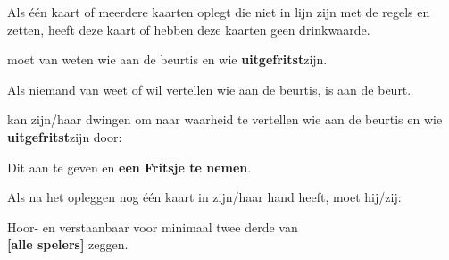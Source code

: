 \vervolgLijst{}
    \item Als \eenSpeler één kaart of meerdere kaarten oplegt die niet in lijn zijn met de regels en zetten, heeft deze kaart of hebben deze kaarten geen drinkwaarde.
\eindLijst{}  


\newpage
{}
\label{sec:beurten_en_zetten_einde}


\vervolgLijst{}
    \item \EenSpeler moet van \alleSpelers weten wie aan de beurt\footnotemark[1] is en wie \textbf{uitgefritst}\footnotemark[2] zijn.
\eindLijst{}

\vervolgLijst{}
    \item Als niemand van \alleSpelers weet of wil vertellen wie aan de beurt\footnotemark[1] is, is \Frits aan de beurt\footnotemark[1].
\eindLijst{}

\vervolgLijst{}
    \item \EenSpeler kan zijn/haar \medeSpelers dwingen om naar waarheid te vertellen wie aan de beurt\footnotemark[1] is en wie \textbf{uitgefritst}\footnotemark[2] zijn door:
    \puntLijst{}
        \item Dit aan te geven en \textbf{een Fritsje te nemen}\footnotemark[3].
    \eindPuntLijst{}
\eindLijst{}


\vervolgLijst{}
    \item Als \eenSpeler na het opleggen nog \'e\'en kaart in zijn/haar hand heeft, moet hij/zij:
    \puntLijst{}
        \item Hoor- en verstaanbaar  voor minimaal twee derde van \\ \textbf{[alle spelers]} zeggen.
    \eindPuntLijst{}
    \label{regel:laatste_frits_1}
\eindLijst{}

